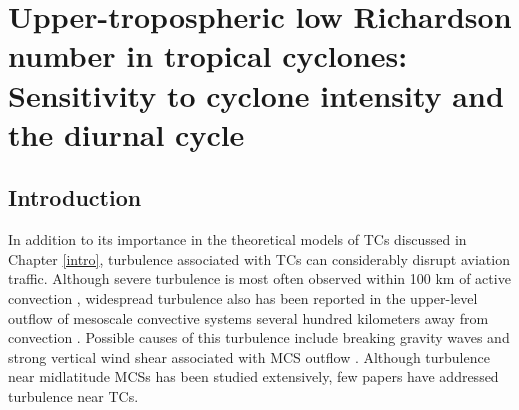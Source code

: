  
\chapter{Upper-tropospheric low Richardson number in tropical cyclones: Sensitivity to cyclone intensity and the diurnal cycle}
\label{chapter:turb}
\resetfootnote %




\section{Introduction}

In addition to its importance in the theoretical models of TCs discussed in Chapter \ref{intro}, turbulence associated with TCs can considerably disrupt aviation traffic.
Although severe turbulence is most often observed within 100 km of active convection \citep{Laneetal2012}, widespread turbulence also has been reported in the upper-level outflow of mesoscale convective systems several hundred kilometers away from convection \citep{TrierSharman2009}.
Possible causes of this turbulence include breaking gravity waves \citep{Laneetal2012} and strong vertical wind shear associated with MCS outflow \citep{Zovko-RajakLane2014}.
Although turbulence near midlatitude MCSs has been studied extensively, few papers have addressed turbulence near TCs.

